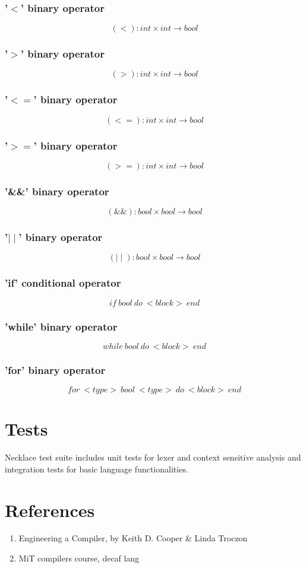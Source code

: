 \documentclass{article}
\begin{document}
\subsubsection{'$<$' binary operator}
$$
(<): int \times int \longrightarrow bool
$$

\subsubsection{'$>$' binary operator}
$$
(>): int \times int \longrightarrow bool
$$
\subsubsection{'$<=$' binary operator}
$$
(<=): int \times int \longrightarrow bool
$$
\subsubsection{'$>=$' binary operator}
$$
(>=): int \times int \longrightarrow bool
$$
\subsubsection{'\&\&' binary operator}
$$
(\&\&): bool \times bool \longrightarrow bool
$$
\subsubsection{'$\mid\mid$' binary operator}
$$
(\mid\mid): bool \times bool \longrightarrow bool
$$
\subsubsection{'if' conditional operator}
$$
if \ bool \ do \ <block> \ end
$$
\subsubsection{'while' binary operator}
$$
while \ bool \ do \ <block> \ end
$$
\subsubsection{'for' binary operator}
$$
for \ <type> \ bool \ <type> \ do \ <block> \ end
$$

\section{Tests}
Necklace test suite includes unit tests for lexer and context sensitive analysis and integration tests for basic language functionalities.



\section{References}
\begin{enumerate}
    \item  Engineering a Compiler, by Keith D. Cooper & Linda Troczon
    \item MiT compilers course, decaf lang
\end{enumerate}
\end{document}
